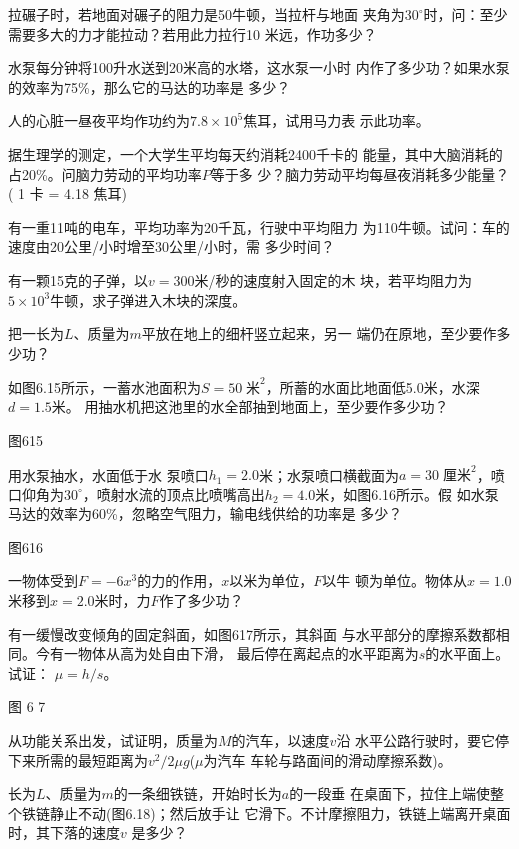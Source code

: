 \begin{exercises}

\exercise 拉碾子时，若地面对碾子的阻力是50牛顿，当拉杆与地面
夹角为$ 30 ^ { \circ } $时，问：至少需要多大的力才能拉动？若用此力拉行10
米远，作功多少？

\exercise 水泵每分钟将100升水送到20米高的水塔，这水泵一小时
内作了多少功？如果水泵的效率为75\%，那么它的马达的功率是
多少？

\exercise 人的心脏一昼夜平均作功约为$ 7.8 \times 10 ^ 5 $焦耳，试用马力表
示此功率。

\exercise 据生理学的测定，一个大学生平均每天约消耗2400千卡的
能量，其中大脑消耗的占20\%。问脑力劳动的平均功率$ P $等于多
少？脑力劳动平均每昼夜消耗多少能量？( 1 卡 = 4.18 焦耳)

\exercise 有一重11吨的电车，平均功率为20千瓦，行驶中平均阻力
为110牛顿。试问：车的速度由20公里/小时增至30公里/小时，需
多少时间？

\exercise 有一颗15克的子弹，以$ v = 300 $米/秒的速度射入固定的木
块，若平均阻力为$ 5 \times 10 ^ { 3 } $牛顿，求子弹进入木块的深度。

\exercise 把一长为$ L $、质量为$ m $平放在地上的细杆竖立起来，另一
端仍在原地，至少要作多少功？

\exercise 如图6.15所示，一蓄水池面积为$ S = 50 \;\text{米} ^ 2 $，所蓄的水面比地面低5.0米，水深$ d=1.5 $米。
用抽水机把这池里的水全部抽到地面上，至少要作多少功？

图615

\exercise 用水泵抽水，水面低于水
泵喷口$ h _ { 1 } = 2.0 $米；水泵喷口横截面为$ a = 3 0 \;\text{厘米} ^ 2 $，喷口仰角为$
30 ^ { \circ } $，喷射水流的顶点比喷嘴高出$ h _ { 2 } = 4.0 $米，如图6.16所示。假
如水泵马达的效率为60\%，忽略空气阻力，输电线供给的功率是
多少？

图616

\exercise 一物体受到$ F = - 6 x ^ { 3 } $的力的作用，$ x $以米为单位，$ F $以牛
顿为单位。物体从$ x = 1.0 $米移到$ x = 2.0 $米时，力$ F $作了多少功？

\exercise 有一缓慢改变倾角的固定斜面，如图617所示，其斜面
与水平部分的摩擦系数都相同。今有一物体从高为处自由下滑，
最后停在离起点的水平距离为$ s $的水平面上。试证： $ \mu = h / s $。

图 6  7

\exercise 从功能关系出发，试证明，质量为$ M $的汽车，以速度$ v $沿
水平公路行驶时，要它停下来所需的最短距离为$ v ^ { 2 } / 2 \mu g $($ \mu $为汽车
车轮与路面间的滑动摩擦系数)。

\exercise 长为$ L $、质量为$ m $的一条细铁链，开始时长为$ a $的一段垂
在桌面下，拉住上端使整个铁链静止不动(图6.18)；然后放手让
它滑下。不计摩擦阻力，铁链上端离开桌面时，其下落的速度$ v $
是多少？


\end{exercises}
